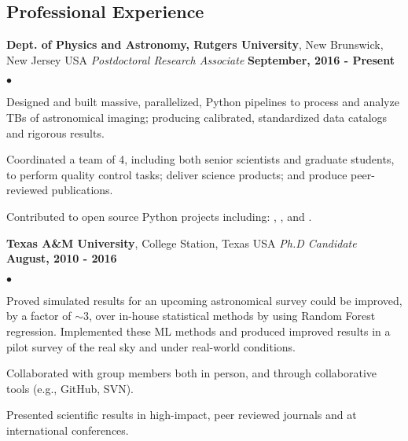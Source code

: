 \documentclass[margin,line, 11pt]{res}
\newenvironment{list2}{
  \begin{list}{$\bullet$}{%
      \setlength{\itemsep}{0in}
      \setlength{\parsep}{0in} \setlength{\parskip}{0in}
      \setlength{\topsep}{0in} \setlength{\partopsep}{0in}
      \setlength{\leftmargin}{0.2in}}}{\end{list}}
\begin{document}
\begin{resume}
\section{Professional \newline Experience}
\textbf{Dept. of Physics and Astronomy, Rutgers University}, New Brunswick, New Jersey USA \newline
\textit{Postdoctoral Research Associate} \hfill \textbf{September, 2016 - Present}\newline
    \begin{list2}
    	\vspace*{-5mm}
    	\item Designed and built massive, parallelized, Python pipelines to process and analyze TBs of astronomical imaging; producing calibrated, standardized data catalogs and rigorous results.
    	\item Coordinated a team of 4, including both senior scientists and graduate students, to perform quality control tasks; deliver science products; and produce peer-reviewed publications.
    	\item Contributed to open source Python projects including: \href{https://github.com/boada/photometrypipeline}{}, \href{http://astlib.sourceforge.net/}{}, and \href{https://github.com/boada/easyGalaxy}{}.
    \end{list2}
\vspace*{-3mm}

\textbf{Texas A\&M University}, College Station, Texas USA\newline
\textit{Ph.D Candidate} \hfill \textbf{August, 2010 - 2016}\newline
    \begin{list2}
    	\vspace*{-5mm}
      \item Proved simulated results for an upcoming astronomical survey could be improved, by a factor of $\sim3$, over in-house statistical methods by using Random Forest regression. Implemented these ML methods and produced improved results in a pilot survey of the real sky and under real-world conditions.
    	\item Collaborated with group members both in person, and through collaborative tools (e.g., GitHub, SVN).
    	\item Presented scientific results in high-impact, peer reviewed journals and at international conferences.
    \end{list2}
\vspace*{-3mm}


\end{resume}
\end{document}
